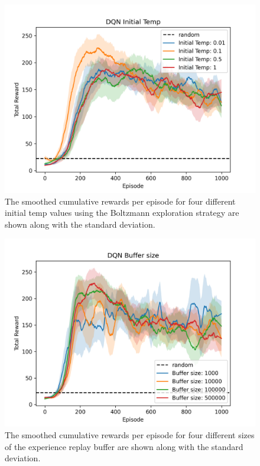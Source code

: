 \documentclass{article}
\begin{document}
\begin{figure}[ht!]
   \centering
   \includegraphics[width=0.9\columnwidth]{assets/fig_hp/temp.initial.png}
   \caption{The smoothed cumulative rewards per episode for four different initial temp values using the Boltzmann exploration strategy are shown along with the standard deviation. 
   }
   \label{fig:comp_temp}
\end{figure}


\begin{figure}[ht!]
   \centering
   \includegraphics[width=0.9\columnwidth]{assets/fig_hp/buffer_size.png}
   \caption{The smoothed cumulative rewards per episode for four different sizes of the experience replay buffer are shown along with the standard deviation. 
   }
   \label{fig:comp_buffer_size}
\end{figure}
\end{document}
